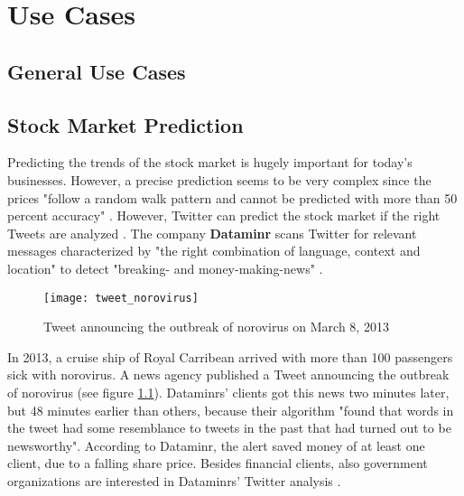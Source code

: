 
\chapter{Use Cases}
\label{cha:use-cases}

\section{General Use Cases}
\label{sec:general-use-cases}


\section{Stock Market Prediction}
\label{sec:stock-market-prediction}
Predicting the trends of the stock market is hugely important for today's businesses. However, a precise prediction seems to be very complex since the prices "follow a random walk pattern and cannot be predicted with more than 50 percent accuracy" \cite[1]{bollen2011twitter}. However, Twitter can predict the stock market if the right Tweets are analyzed \cite{bollen2011twitter}. The company \textbf{Dataminr} scans Twitter for relevant messages characterized by "the right combination of language, context and location" to detect "breaking- and money-making-news" \cite{alcorn2013stockmarket}.

\begin{figure}[H]
  \centering
        \texttt{[image: tweet\_norovirus]}
  \caption[Tweet announcing the outbreak of norovirus on March 8, 2013]{Tweet announcing the outbreak of norovirus on March 8, 2013 \cite{wsvnnorovirus2013}}
  \label{fig:use_case_stock_market}
  \vspace{-1.3em}
\end{figure}

In 2013, a cruise ship of Royal Carribean arrived with more than 100 passengers sick with norovirus. A news agency published a Tweet announcing the outbreak of norovirus (see figure \ref{fig:use_case_stock_market}). Dataminrs' clients got this news two minutes later, but 48 minutes earlier than others, because their algorithm "found that words in the tweet had some resemblance to tweets in the past that had turned out to be newsworthy". According to Dataminr, the alert saved money of at least one client, due to a falling share price. Besides financial clients, also government organizations are interested in Dataminrs' Twitter analysis \cite{alcorn2013stockmarket}.


